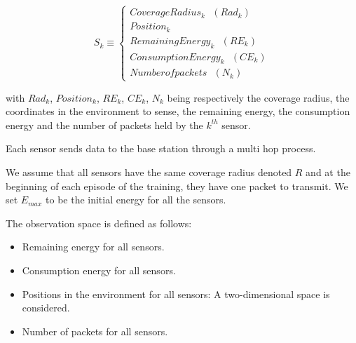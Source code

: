 \documentclass[journal]{IEEEtran}
\begin{document}
\begin{equation} 
S_k \equiv 
\begin{cases}
CoverageRadius_k \text{ } \left(Rad_k\right)  \\
Position_k \\
RemainingEnergy_k \text{ } \left(RE_k\right) \\
ConsumptionEnergy_k \text{ } \left(CE_k\right) \\
Number of packets \text{ } \left(N_k\right) 
\end{cases}
\end{equation}

with $Rad_k$, $Position_k$, $RE_k$, $CE_k$, $N_k$ being respectively the coverage radius, the coordinates in the environment to sense, the remaining energy, the consumption energy and the number of packets held by the $k^{th}$ sensor.  

Each sensor sends data to the base station through a multi hop process.

We assume that all sensors have the same coverage radius denoted $R$ and at the beginning of each episode of the training, they have one packet to transmit. We set $E_{max}$ to be the initial energy for all the sensors. 

The observation space is defined as follows:
\begin{itemize}
    \item Remaining energy for all sensors.
    \item Consumption energy for all sensors.
    \item Positions in the environment for all sensors: A two-dimensional space is considered.
    \item Number of packets for all sensors.
\end{itemize}	
    
\end{document}
